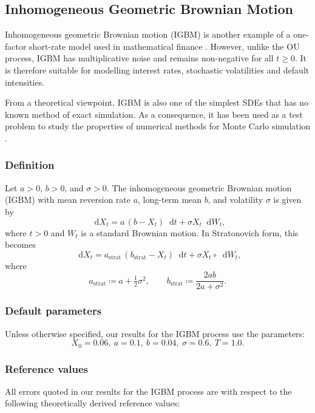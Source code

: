 \documentclass[11pt, letterpaper]{article}
\theoremstyle{definition}
\theoremstyle{remark}
\newcommand{\diff}{\mathop{}\!\mathrm{d}}
\begin{document}
\begin{appendices}
\subsection{Inhomogeneous Geometric Brownian Motion}\label{app:igbm}
Inhomogeneous geometric Brownian motion (IGBM) is another example of a one-factor short-rate model used in mathematical finance \cite{capriotti2018igbm}.
However, unlike the OU process, IGBM has multiplicative noise and remains non-negative for all $t\geq 0$.
It is therefore suitable for modelling interest rates, stochastic volatilities and default intensities.

From a theoretical viewpoint, IGBM is also one of the simplest SDEs that has no known method of exact simulation.
As a consequence, it has been used as a test problem to study the properties of numerical methods for Monte Carlo simulation \cite{tubikanec2022igbm}.

\subsubsection*{Definition}
Let $a > 0$, $b > 0$, and $\sigma > 0$. The inhomogeneous geometric Brownian motion (IGBM) with mean reversion rate $a$, long-term mean $b$, and volatility $\sigma$ is given by
\begin{equation}\label{eq:igbm_ito}
    \diff X_t = a\,(b - X_t) \diff t + \sigma X_t \diff W_t,
\end{equation}
where $t > 0$ and $W_t$ is a standard Brownian motion.
In Stratonovich form, this becomes
\begin{equation}\label{eq:igbm_strat}
\diff X_t = a_{\text{strat}}\,(b_{\text{strat}} - X_t) \diff t + \sigma X_t \circ \diff W_t,
\end{equation}
where
\begin{equation*}
  a_{\text{strat}} \coloneqq a + \tfrac{1}{2}\sigma^2,\qquad
  b_{\text{strat}} \coloneqq \frac{2ab}{2a + \sigma^2}.
\end{equation*}

\subsubsection*{Default parameters}
Unless otherwise specified, our results for the IGBM process use the parameters:
\[X_{0}=0.06,\ a=0.1,\ b=0.04,\ \sigma=0.6,\ T = 1.0.\]

\subsubsection*{Reference values}
All errors quoted in our results for the IGBM process are with respect to the following theoretically derived reference values:


\end{appendices}
\end{document}

